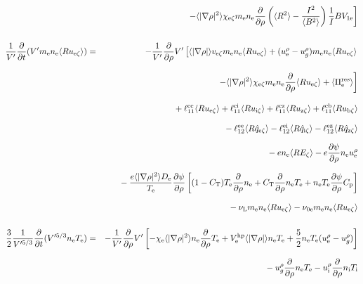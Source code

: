 \documentclass[11pt]{article}
\def\r#1{{\rm#1}}
\def\aves#1{\langle#1\rangle}
\def\dd#1#2{\frac{\partial #1}{\partial #2}}
\def\para{\parallel}
\def\ddrho{\frac{\partial}{\partial\rho}}
\def\ddt{\frac{\partial}{\partial t}}
\def\me{m_\r{e}}
\def\nee{n_\r{e}}
\def\ni{n_\r{i}}
\def\Te{T_\r{e}}
\def\Ti{T_\r{i}}
\def\uzt#1{u_{\r{#1}\zeta}}
\def\qzt#1{\hat{q}_{\r{#1}\zeta}}
\def\upara#1{u_{\r{#1}\para}}
\def\urho#1{u_\r{#1}^\rho}
\def\ugrho{u_{g}^\rho}
\def\chis#1{\chi_\r{#1}}
\def\De{D_\r{e}}
\def\nun#1{\nu_\r{0#1}}
\def\bri{\aves{B^2}\aves{R^2} - I^2}
\def\nuL{\nu_\r{L}}
\begin{document}
\begin{eqnarray}
\nonumber\\[3mm]&&{}
    \left.- \aves{|\nabla\rho|^2} \chis{e\zeta} \me \nee
          \ddrho \left(\aves{R^2} - \frac{I^2}{\aves{B^2}}\right) \frac{1}{I}BV_{1\r{e}}\right]
\\[5mm]
 \frac{1}{V'} \ddt (V' \me \nee \aves{R \uzt{e}}) &=&
%
  - \frac{1}{V'} \ddrho V' \left[  \aves{|\nabla\rho|} v_{\r{e}\zeta} \me \nee \aves{R \uzt{e}}
			       +   (\urho{e} - \ugrho) \me \nee \aves{R \uzt{e}} \right.
\nonumber\\[3mm]&&{}
                           \left.- \aves{|\nabla\rho|^2} \chis{e\zeta} \me \nee \ddrho \aves{R \uzt{e}}
                               + \aves{\Pi_\r{e}^\r{res}} \right]
\nonumber\\[3mm]&&{}
%
  + \ell_{11}^\r{ee} \aves{R \uzt{e}}
  + \ell_{11}^\r{ei} \aves{R \uzt{i}}
  + \ell_{11}^\r{ez} \aves{R \uzt{z}}
  + \ell_{11}^\r{eb} \aves{R \uzt{b}}
\nonumber\\[2.5mm]&&{}
%
  - \ell_{12}^\r{ee} \aves{R \qzt{e}}
  - \ell_{12}^\r{ei} \aves{R \qzt{i}}
  - \ell_{12}^\r{ez} \aves{R \qzt{z}}
\nonumber\\[2.5mm]&&{}
%
  - e                 \nee \aves{R E_\zeta}
%
  - e \dd{\psi}{\rho} \nee \urho{e}
%
\nonumber\\[2.5mm]&&{}
%
%
%
  - \frac{e \aves{|\nabla\rho|^2} \De}{\Te}  \dd{\psi}{\rho}
  \left[  (1-C_\r{T})\Te \ddrho \nee
        + C_\r{T} \ddrho \nee \Te
	+ \nee \Te \dd{\psi}{\rho} C_\r{p}\right]
\nonumber\\[2.5mm]&&{}
%
  - \nuL  \me \nee \aves{R \uzt{e}}
%
  - \nun{e} \me \nee \aves{R \uzt{e}}
\\[5mm]
 \frac{3}{2}\frac{1}{V'^{5/3}} \ddt (V'^{5/3} \nee \Te ) &=& 
%
  - \frac{1}{V'} \ddrho V'
    \left[ - \chis{e}       \aves{|\nabla\rho|^2} \nee \ddrho \Te
           + V_\r{e}^\r{hp} \aves{|\nabla\rho|}   \nee \Te
           + \frac{5}{2} \nee \Te ( \urho{e} - \ugrho ) \right]
\nonumber\\[2.5mm]&&{}
%
  - \ugrho \ddrho \nee \Te
%
  - \urho{i} \ddrho \ni  \Ti

\end{eqnarray}
\end{document}
